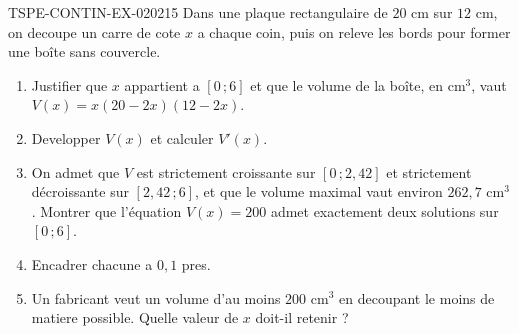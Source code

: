 \begin{exercice}{TSPE-CONTIN-EX-020}{2}{15}
Dans une plaque rectangulaire de $20$ cm sur $12$ cm, on decoupe un carre de cote $x$ a chaque coin, puis on releve les bords pour former une boîte sans couvercle.
\begin{enumerate}
  \item Justifier que $x$ appartient a $[0\,;6]$ et que le volume de la boîte, en cm$^3$, vaut $V(x) = x(20-2x)(12-2x)$.
  \item Developper $V(x)$ et calculer $V'(x)$.
  \item On admet que $V$ est strictement croissante sur $[0\,;2{,}42]$ et strictement décroissante sur $[2{,}42\,;6]$, et que le volume maximal vaut environ $262{,}7$ cm$^3$. Montrer que l'équation $V(x) = 200$ admet exactement deux solutions sur $[0\,;6]$.
  \item Encadrer chacune a $0{,}1$ pres.
  \item Un fabricant veut un volume d'au moins $200$ cm$^3$ en decoupant le moins de matiere possible. Quelle valeur de $x$ doit-il retenir ?
\end{enumerate}
\end{exercice}
